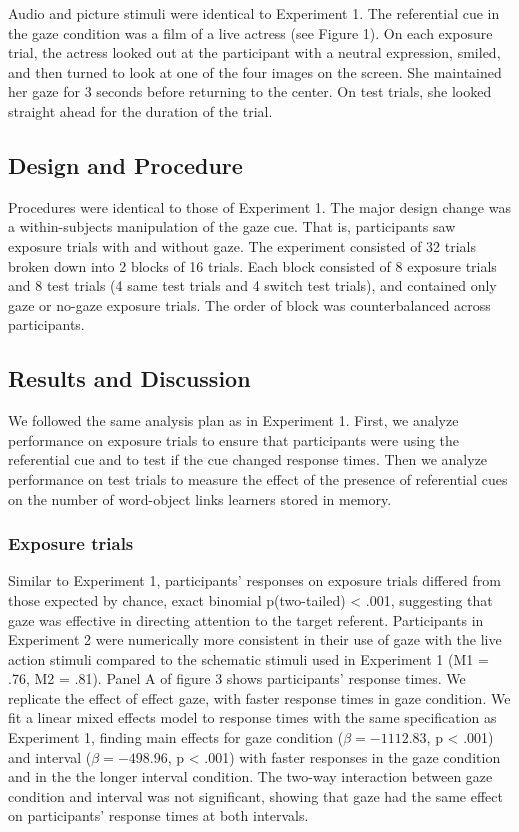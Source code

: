 \documentclass[12pt,]{article}
\begin{document}
Audio and picture stimuli were identical to Experiment 1. The
referential cue in the gaze condition was a film of a live actress (see
Figure 1). On each exposure trial, the actress looked out at the
participant with a neutral expression, smiled, and then turned to look
at one of the four images on the screen. She maintained her gaze for 3
seconds before returning to the center. On test trials, she looked
straight ahead for the duration of the trial.

\subsection{Design and Procedure}\label{design-and-procedure-1}

Procedures were identical to those of Experiment 1. The major design
change was a within-subjects manipulation of the gaze cue. That is,
participants saw exposure trials with and without gaze. The experiment
consisted of 32 trials broken down into 2 blocks of 16 trials. Each
block consisted of 8 exposure trials and 8 test trials (4 same test
trials and 4 switch test trials), and contained only gaze or no-gaze
exposure trials. The order of block was counterbalanced across
participants.

\subsection{Results and Discussion}\label{results-and-discussion-1}

We followed the same analysis plan as in Experiment 1. First, we analyze
performance on exposure trials to ensure that participants were using
the referential cue and to test if the cue changed response times. Then
we analyze performance on test trials to measure the effect of the
presence of referential cues on the number of word-object links learners
stored in memory.

\subsubsection{Exposure trials}\label{exposure-trials-1}

Similar to Experiment 1, participants' responses on exposure trials
differed from those expected by chance, exact binomial p(two-tailed)
\textless{} .001, suggesting that gaze was effective in directing
attention to the target referent. Participants in Experiment 2 were
numerically more consistent in their use of gaze with the live action
stimuli compared to the schematic stimuli used in Experiment 1 (M1 =
.76, M2 = .81). Panel A of figure 3 shows participants' response times.
We replicate the effect of effect gaze, with faster response times in
gaze condition. We fit a linear mixed effects model to response times
with the same specification as Experiment 1, finding main effects for
gaze condition (\(\beta = -1112.83\), p \textless{} .001) and interval
(\(\beta = -498.96\), p \textless{} .001) with faster responses in the
gaze condition and in the the longer interval condition. The two-way
interaction between gaze condition and interval was not significant,
showing that gaze had the same effect on participants' response times at
both intervals.
\end{document}
